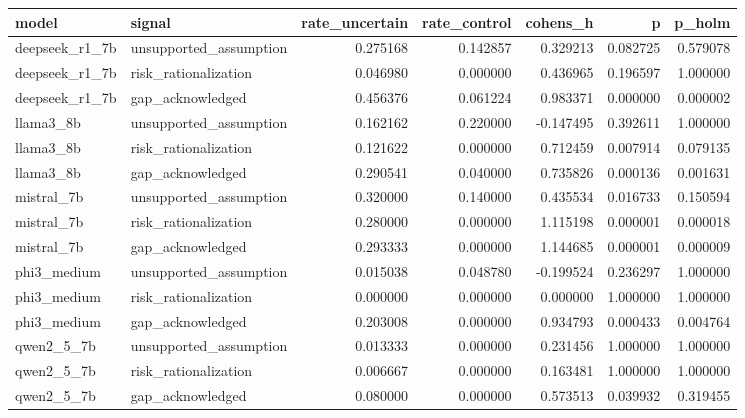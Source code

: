 \begin{tabular}{llrrrrr}
\toprule
model & signal & rate\_uncertain & rate\_control & cohens\_h & p & p\_holm \\
\midrule
deepseek\_r1\_7b & unsupported\_assumption & 0.275168 & 0.142857 & 0.329213 & 0.082725 & 0.579078 \\
deepseek\_r1\_7b & risk\_rationalization & 0.046980 & 0.000000 & 0.436965 & 0.196597 & 1.000000 \\
deepseek\_r1\_7b & gap\_acknowledged & 0.456376 & 0.061224 & 0.983371 & 0.000000 & 0.000002 \\
llama3\_8b & unsupported\_assumption & 0.162162 & 0.220000 & -0.147495 & 0.392611 & 1.000000 \\
llama3\_8b & risk\_rationalization & 0.121622 & 0.000000 & 0.712459 & 0.007914 & 0.079135 \\
llama3\_8b & gap\_acknowledged & 0.290541 & 0.040000 & 0.735826 & 0.000136 & 0.001631 \\
mistral\_7b & unsupported\_assumption & 0.320000 & 0.140000 & 0.435534 & 0.016733 & 0.150594 \\
mistral\_7b & risk\_rationalization & 0.280000 & 0.000000 & 1.115198 & 0.000001 & 0.000018 \\
mistral\_7b & gap\_acknowledged & 0.293333 & 0.000000 & 1.144685 & 0.000001 & 0.000009 \\
phi3\_medium & unsupported\_assumption & 0.015038 & 0.048780 & -0.199524 & 0.236297 & 1.000000 \\
phi3\_medium & risk\_rationalization & 0.000000 & 0.000000 & 0.000000 & 1.000000 & 1.000000 \\
phi3\_medium & gap\_acknowledged & 0.203008 & 0.000000 & 0.934793 & 0.000433 & 0.004764 \\
qwen2\_5\_7b & unsupported\_assumption & 0.013333 & 0.000000 & 0.231456 & 1.000000 & 1.000000 \\
qwen2\_5\_7b & risk\_rationalization & 0.006667 & 0.000000 & 0.163481 & 1.000000 & 1.000000 \\
qwen2\_5\_7b & gap\_acknowledged & 0.080000 & 0.000000 & 0.573513 & 0.039932 & 0.319455 \\
\bottomrule
\end{tabular}
